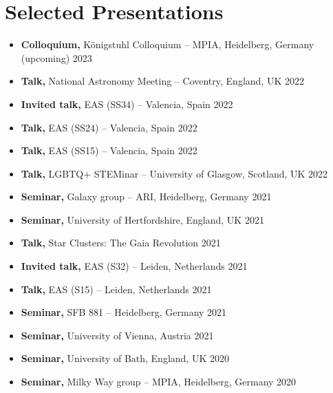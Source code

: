 \documentclass[12pt, letterpaper]{hunt-cv}
\begin{document}
\section*{Selected Presentations}

\begin{itemize}
    \item \textbf{Colloquium,} Königstuhl Colloquium -- MPIA, Heidelberg, Germany \hfill (upcoming) 2023
    \item \textbf{Talk,} National Astronomy Meeting -- Coventry, England, UK \hfill 2022
    \item \textbf{Invited talk,} EAS (SS34) -- Valencia, Spain \hfill 2022
    \item \textbf{Talk,} EAS (SS24) -- Valencia, Spain \hfill 2022
    \item \textbf{Talk,} EAS (SS15) -- Valencia, Spain \hfill 2022
    \item \textbf{Talk,} LGBTQ+ STEMinar  -- University of Glasgow, Scotland, UK \hfill 2022
    \item \textbf{Seminar,} Galaxy group -- ARI, Heidelberg, Germany \hfill 2021
    \item \textbf{Seminar,} University of Hertfordshire, England, UK \hfill 2021
    \item \textbf{Talk,} Star Clusters: The Gaia Revolution \hfill 2021
    \item \textbf{Invited talk,} EAS (S32) -- Leiden, Netherlands \hfill 2021
    \item \textbf{Talk,} EAS (S15) -- Leiden, Netherlands \hfill 2021
    \item \textbf{Seminar,} SFB 881 -- Heidelberg, Germany \hfill 2021
    \item \textbf{Seminar,} University of Vienna, Austria \hfill 2021
    \item \textbf{Seminar,} University of Bath, England, UK \hfill 2020
    \item \textbf{Seminar,} Milky Way group -- MPIA, Heidelberg, Germany \hfill 2020
\end{itemize}


\end{document}
